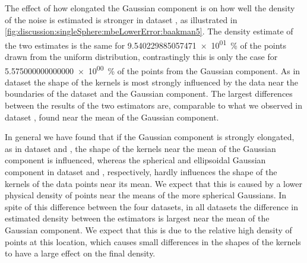 
		The effect of how elongated the Gaussian component is on how well the density of the noise is estimated is stronger in dataset \baakmanFive, as illustrated in \cref{fig:discussion:singleSphere:mbeLowerError:baakman5}. The density estimate of the two estimates is the same for \SI{9.540229885057471e+01}{\percent} of the points drawn from the uniform distribution, contrastingly this is only the case for \SI{5.575000000000000e+00}{\percent} of the points from the Gaussian component. 
		As in dataset \baakmanFour the shape of the kernels is most strongly influenced by the data near the boundaries of the dataset and the Gaussian component.
		The largest differences between the results of the two estimators are, comparable to what we observed in dataset \baakmanFour, found near the mean of the Gaussian component. 

In general we have found that if the Gaussian component is strongly elongated, as in dataset \baakmanFour and \baakmanFive, the shape of the kernels near the mean of the Gaussian component is influenced, whereas the spherical and ellipsoidal Gaussian component in dataset \ferdosiOne and \baakmanOne, respectively, hardly influences the shape of the kernels of the data points near its mean. We expect that this is caused by a lower physical density of points near the means of the more spherical Gaussians. 
In spite of this difference between the four datasets, in all datasets the difference in estimated density between the estimators is largest near the mean of the Gaussian component. We expect that this is due to the relative high density of points at this location, which causes small differences in the shapes of the kernels to have a large effect on the final density. 